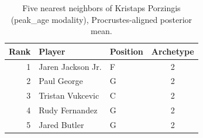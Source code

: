 \begin{table}[htbp]
  \centering\small
  \begin{tabular}{rllc}
    \toprule
    Rank & Player & Position & Archetype \\
    \midrule
    1 & Jaren Jackson Jr. & F & 2 \\
    2 & Paul George & G & 2 \\
    3 & Tristan Vukcevic & C & 2 \\
    4 & Rudy Fernandez & G & 2 \\
    5 & Jared Butler & G & 2 \\
    \bottomrule
  \end{tabular}
  \caption{Five nearest neighbors of Kristaps Porzingis (peak_age modality), Procrustes-aligned posterior mean.}
  \label{tab:Kristaps_Porzingis_neighbors_peak_age}
\end{table}

